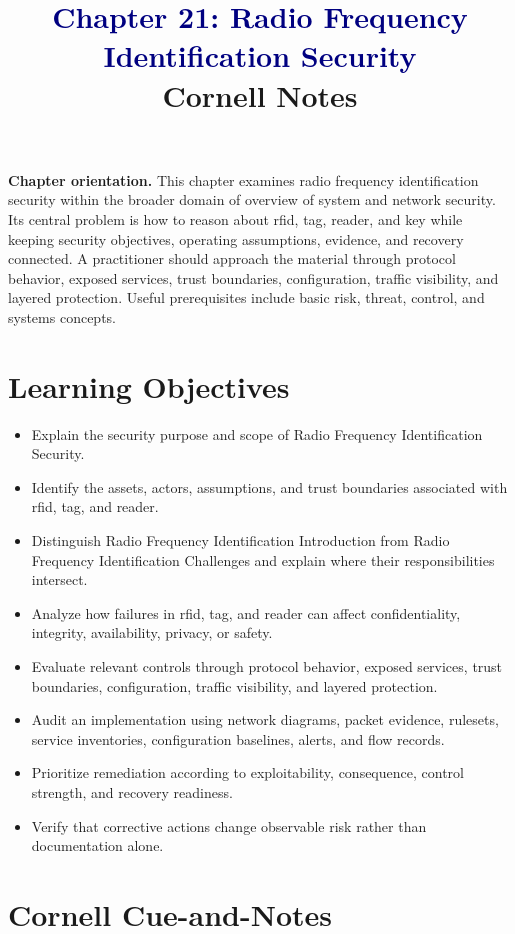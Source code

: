 \documentclass[11pt]{article}
\title{\textcolor{Navy}{Chapter 21: Radio Frequency Identification Security}\\[2mm]\large Cornell Notes}
\author{}
\date{}
\begin{document}
\maketitle
\thispagestyle{fancy}
\vspace{-1.5em}
\begin{orientationbox}
\textbf{Chapter orientation.} This chapter examines radio frequency identification security within the broader domain of overview of system and network security. Its central problem is how to reason about rfid, tag, reader, and key while keeping security objectives, operating assumptions, evidence, and recovery connected. A practitioner should approach the material through protocol behavior, exposed services, trust boundaries, configuration, traffic visibility, and layered protection. Useful prerequisites include basic risk, threat, control, and systems concepts.
\end{orientationbox}
\section*{Learning Objectives}
\begin{itemize}
\item Explain the security purpose and scope of Radio Frequency Identification Security.
\item Identify the assets, actors, assumptions, and trust boundaries associated with rfid, tag, and reader.
\item Distinguish Radio Frequency Identification Introduction from Radio Frequency Identification Challenges and explain where their responsibilities intersect.
\item Analyze how failures in rfid, tag, and reader can affect confidentiality, integrity, availability, privacy, or safety.
\item Evaluate relevant controls through protocol behavior, exposed services, trust boundaries, configuration, traffic visibility, and layered protection.
\item Audit an implementation using network diagrams, packet evidence, rulesets, service inventories, configuration baselines, alerts, and flow records.
\item Prioritize remediation according to exploitability, consequence, control strength, and recovery readiness.
\item Verify that corrective actions change observable risk rather than documentation alone.
\end{itemize}
\section*{Cornell Cue-and-Notes}
\end{document}
